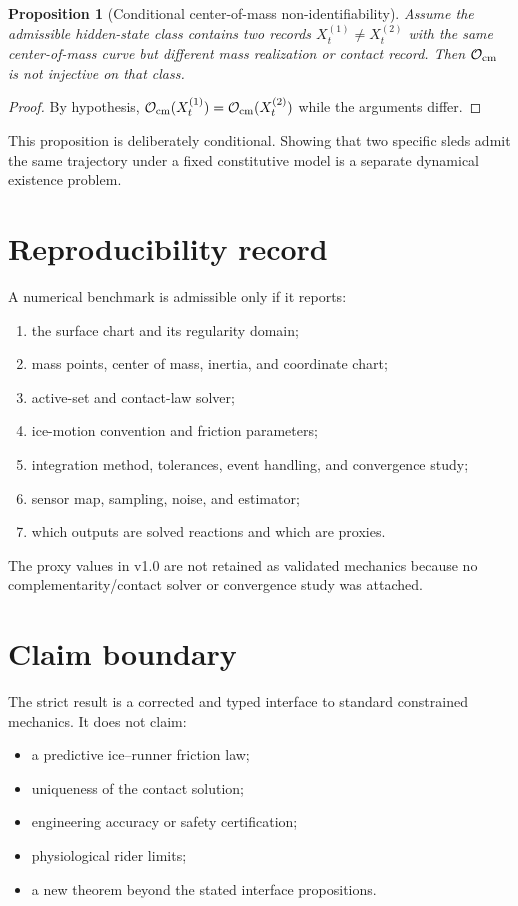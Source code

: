 \documentclass[11pt,a4paper]{article}
\theoremstyle{definition}
\theoremstyle{plain}
\newtheorem{proposition}[definition]{Proposition}
\theoremstyle{remark}
\newcommand{\Ocal}{\mathcal O}
\begin{document}
\begin{proposition}[Conditional center-of-mass non-identifiability]
Assume the admissible hidden-state class contains two records
\(X_t^{(1)}\ne X_t^{(2)}\) with the same center-of-mass curve but
different mass realization or contact record. Then
\(\Ocal_{\rm cm}\) is not injective on that class.
\end{proposition}

\begin{proof}
By hypothesis,
\(\Ocal_{\rm cm}(X_t^{(1)})=\Ocal_{\rm cm}(X_t^{(2)})\) while the
arguments differ.
\end{proof}

This proposition is deliberately conditional. Showing that two
specific sleds admit the same trajectory under a fixed constitutive
model is a separate dynamical existence problem.

\section{Reproducibility record}

A numerical benchmark is admissible only if it reports:
\begin{enumerate}[label=(\roman*)]
  \item the surface chart and its regularity domain;
  \item mass points, center of mass, inertia, and coordinate chart;
  \item active-set and contact-law solver;
  \item ice-motion convention and friction parameters;
  \item integration method, tolerances, event handling, and convergence
  study;
  \item sensor map, sampling, noise, and estimator;
  \item which outputs are solved reactions and which are proxies.
\end{enumerate}
The proxy values in v1.0 are not retained as validated mechanics
because no complementarity/contact solver or convergence study was
attached.

\section{Claim boundary}

The strict result is a corrected and typed interface to standard
constrained mechanics. It does not claim:
\begin{itemize}
  \item a predictive ice--runner friction law;
  \item uniqueness of the contact solution;
  \item engineering accuracy or safety certification;
  \item physiological rider limits;
  \item a new theorem beyond the stated interface propositions.
\end{itemize}
\end{document}
